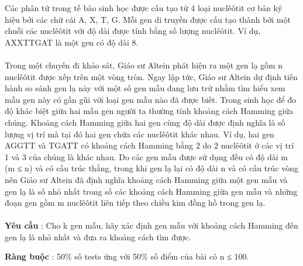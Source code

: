 Các phân tử trong tế bào sinh học được cấu tạo từ 4 loại nuclêôtit cơ bản ký hiệu bởi các chữ cái A, X, T, G. Mỗi gen di truyền được cấu tạo thành bởi một chuỗi các nuclêôtit với độ dài được tính bằng số lượng nuclêôtit. Ví dụ, AXXTTGAT là một gen có độ dài 8.
\\
\\Trong một chuyến đi khảo sát, Giáo sư Altein phát hiện ra một gen lạ gồm n nuclêôtit được xếp trên một vòng tròn. Ngay lập tức, Giáo sư Altein dự định tiến hành so sánh gen lạ này với một số gen mẫu đang lưu trữ nhằm tìm hiểu xem mẫu gen này có gần gũi với loại gen mẫu nào đã được biết. Trong sinh học để đo độ khác biệt giữa hai mẫu gen người ta thường tính khoảng cách Hamming giữa chúng. Khoảng cách Hamming giữa hai gen cùng độ dài được định nghĩa là số lượng vị trí mà tại đó hai gen chứa các nuclêôtit khác nhau. Ví dụ, hai gen AGGTT và TGATT có khoảng cách Hamming bằng 2 do 2 nuclêôtit ở các vị trí 1 và 3 của chúng là khác nhau. Do các gen mẫu được sử dụng đều có độ dài m (m ≤ n) và có cấu trúc thẳng, trong khi gen lạ lại có độ dài n và có cấu trúc vòng nên Giáo sư Altein đã định nghĩa khoảng cách Hamming giữa một gen mẫu và gen lạ là số nhỏ nhất trong số các khoảng cách Hamming giữa gen mẫu và những đoạn gen gồm m nuclêôtit liên tiếp theo chiều kim đồng hồ trong gen lạ.
\\
\\\textbf{Yêu cầu } : Cho k gen mẫu, hãy xác định gen mẫu với khoảng cách Hamming đến gen lạ là nhỏ nhất và đưa ra khoảng cách tìm được.

\textbf{Ràng buộc } : 50\% số tests ứng với 50\% số điểm của bài có n ≤ 100.